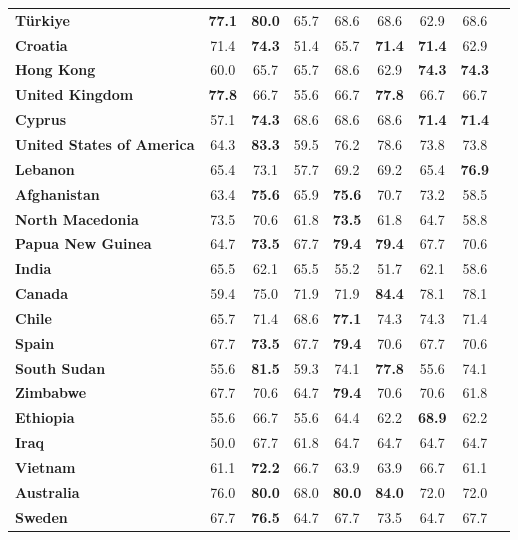 \begin{table}
{\begin{tabular}{lcccccccc}
\textbf{Türkiye} & \textbf{77.1} & \textbf{80.0} & 65.7 & 68.6 & 68.6 & 62.9 & 68.6 \\
\textbf{Croatia} & 71.4 & \textbf{74.3} & 51.4 & 65.7 & \textbf{71.4} & \textbf{71.4} & 62.9 \\
\textbf{Hong Kong} & 60.0 & 65.7 & 65.7 & 68.6 & 62.9 & \textbf{74.3} & \textbf{74.3} \\
\textbf{United Kingdom} & \textbf{77.8} & 66.7 & 55.6 & 66.7 & \textbf{77.8} & 66.7 & 66.7 \\
\textbf{Cyprus} & 57.1 & \textbf{74.3} & 68.6 & 68.6 & 68.6 & \textbf{71.4} & \textbf{71.4} \\
\textbf{United States of America} & 64.3 & \textbf{83.3} & 59.5 & 76.2 & 78.6 & 73.8 & 73.8 \\
\textbf{Lebanon} & 65.4 & 73.1 & 57.7 & 69.2 & 69.2 & 65.4 & \textbf{76.9} \\
\textbf{Afghanistan} & 63.4 & \textbf{75.6} & 65.9 & \textbf{75.6} & 70.7 & 73.2 & 58.5 \\
\textbf{North Macedonia} & 73.5 & 70.6 & 61.8 & \textbf{73.5} & 61.8 & 64.7 & 58.8 \\
\textbf{Papua New Guinea} & 64.7 & \textbf{73.5} & 67.7 & \textbf{79.4} & \textbf{79.4} & 67.7 & 70.6 \\
\textbf{India} & 65.5 & 62.1 & 65.5 & 55.2 & 51.7 & 62.1 & 58.6 \\
\textbf{Canada} & 59.4 & 75.0 & 71.9 & 71.9 & \textbf{84.4} & 78.1 & 78.1 \\
\textbf{Chile} & 65.7 & 71.4 & 68.6 & \textbf{77.1} & 74.3 & 74.3 & 71.4 \\
\textbf{Spain} & 67.7 & \textbf{73.5} & 67.7 & \textbf{79.4} & 70.6 & 67.7 & 70.6 \\
\textbf{South Sudan} & 55.6 & \textbf{81.5} & 59.3 & 74.1 & \textbf{77.8} & 55.6 & 74.1 \\
\textbf{Zimbabwe} & 67.7 & 70.6 & 64.7 & \textbf{79.4} & 70.6 & 70.6 & 61.8 \\
\textbf{Ethiopia} & 55.6 & 66.7 & 55.6 & 64.4 & 62.2 & \textbf{68.9} & 62.2 \\
\textbf{Iraq} & 50.0 & 67.7 & 61.8 & 64.7 & 64.7 & 64.7 & 64.7 \\
\textbf{Vietnam} & 61.1 & \textbf{72.2} & 66.7 & 63.9 & 63.9 & 66.7 & 61.1 \\
\textbf{Australia} & 76.0 & \textbf{80.0} & 68.0 & \textbf{80.0} & \textbf{84.0} & 72.0 & 72.0 \\
\textbf{Sweden} & 67.7 & \textbf{76.5} & 64.7 & 67.7 & 73.5 & 64.7 & 67.7 \\

\end{tabular}}
\end{table}
